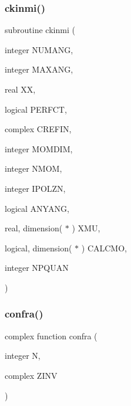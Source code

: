 \subsubsection{\texorpdfstring{ckinmi()}{ckinmi()}}
{\footnotesize\ttfamily subroutine ckinmi (\begin{DoxyParamCaption}\item[{integer}]{N\+U\+M\+A\+NG,  }\item[{integer}]{M\+A\+X\+A\+NG,  }\item[{real}]{XX,  }\item[{logical}]{P\+E\+R\+F\+CT,  }\item[{complex}]{C\+R\+E\+F\+IN,  }\item[{integer}]{M\+O\+M\+D\+IM,  }\item[{integer}]{N\+M\+OM,  }\item[{integer}]{I\+P\+O\+L\+ZN,  }\item[{logical}]{A\+N\+Y\+A\+NG,  }\item[{real, dimension( $\ast$ )}]{X\+MU,  }\item[{logical, dimension( $\ast$ )}]{C\+A\+L\+C\+MO,  }\item[{integer}]{N\+P\+Q\+U\+AN }\end{DoxyParamCaption})}

\mbox{\label{wiscombe__miev__1_2_m_i_e_v0_8f_ad91aace4d77229d367c28c78965a0bd5}} 
\subsubsection{\texorpdfstring{confra()}{confra()}}
{\footnotesize\ttfamily complex function confra (\begin{DoxyParamCaption}\item[{integer}]{N,  }\item[{complex}]{Z\+I\+NV }\end{DoxyParamCaption})}

\mbox{\label{wiscombe__miev__1_2_m_i_e_v0_8f_a6fcb83505689f74c82cf122a250675b6}} 
